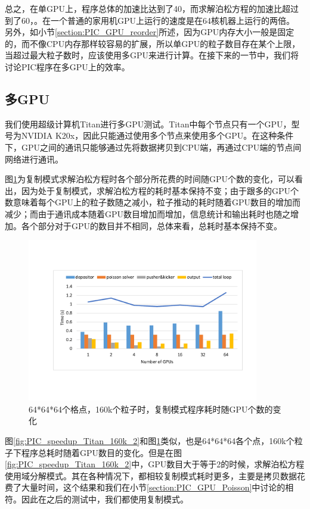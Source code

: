 总之，在单GPU上，程序总体的加速比达到了40，而求解泊松方程的加速比超过到了60，。在一个普通的家用机GPU上运行的速度是在64核机器上运行的两倍。
另外，如小节\ref{section:PIC_GPU_reorder}所述，因为GPU内存大小一般是固定的，而不像CPU内存那样较容易的扩展，所以单GPU的粒子数目存在某个上限，当超过最大粒子数时，应该使用多GPU来进行计算。在接下来的一节中，我们将讨论PIC程序在多GPU上的效率。

\subsection{多GPU}
我们使用超级计算机Titan进行多GPU测试。Titan中每个节点只有一个GPU，型号为NVIDIA K20x，因此只能通过使用多个节点来使用多个GPU。在这种条件下，GPU之间的通讯只能够通过先将数据拷贝到CPU端，再通过CPU端的节点间网络进行通讯。

图\ref{fig:PIC_speedup_Titan_160k_1}为复制模式求解泊松方程时各个部分所花费的时间随GPU个数的变化，可以看出，因为处于复制模式，求解泊松方程的耗时基本保持不变；由于跟多的GPU个数意味着每个GPU上的粒子数随之减小，粒子推动的耗时随着GPU数目的增加而减少；而由于通讯成本随着GPU数目增加而增加，信息统计和输出耗时也随之增加。各个部分对于GPU的数目并不相同，总体来看，总耗时基本保持不变。

\begin{figure}[!htb]
  \centering
  \includegraphics[width=0.9\textwidth]{Img/PIC_speedup_Titan_160k_1.pdf}
  \caption{64*64*64个格点，160k个粒子时，复制模式程序耗时随GPU个数的变化}
  \label{fig:PIC_speedup_Titan_160k_1}
\end{figure}

图\ref{fig:PIC_speedup_Titan_160k_2}和图\ref{fig:PIC_speedup_Titan_160k_1}类似，也是64*64*64各个点，160k个粒子下程序总耗时随着GPU数目的变化。但是在图\ref{fig:PIC_speedup_Titan_160k_2}中，GPU数目大于等于2的时候，求解泊松方程使用域分解模式。其在各种情况下，都相较复制模式耗时更多，主要是拷贝数据花费了大量时间，这个结果和我们在小节\ref{section:PIC_GPU_Poisson}中讨论的相符。因此在之后的测试中，我们都使用复制模式。

